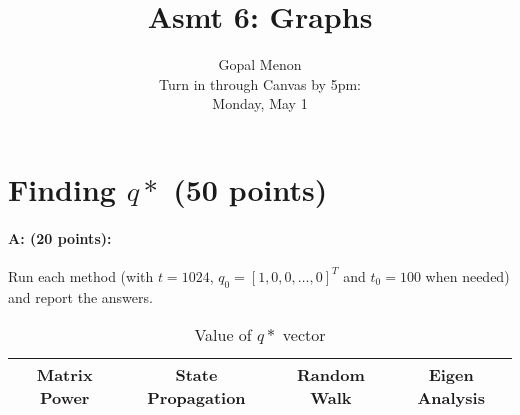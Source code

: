 \documentclass[11pt]{article}
\title{Asmt 6: Graphs}
\author{Gopal Menon\\Turn in through Canvas by 5pm: \\
Monday, May 1}
\date{}
\begin{document}
\maketitle


%
\section{Finding $q*$ (50 points)}
\paragraph{A: (20 points):} 
Run each method (with $t = 1024$, $q_0 = [1, 0, 0, \ldots, 0]^T$ and $t_0 = 100$ when needed) and report the answers.

    \begin{table}[!h] 
    \centering
    \label{6A}
    \caption{Value of $q*$ vector}
    \begin{tabular}{|c|c|c|c|}
      \hline
    Matrix Power & State Propagation & Random Walk & Eigen Analysis  \\
      \hline        
      

\end{tabular}
\end{table}
\end{document}
